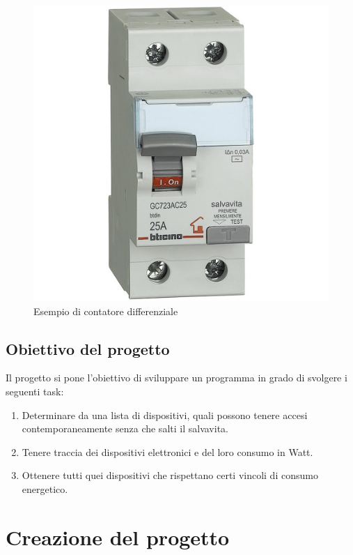 \documentclass[12pt, letterpaper]{article}
\begin{document}
\begin{figure}
      \centering
      \includegraphics[scale=0.2]{interruttore-diff.jpg}
      \caption{Esempio di contatore differenziale}
\end{figure}


\subsection{Obiettivo del progetto}

Il progetto si pone l'obiettivo di sviluppare un programma in grado di svolgere
i seguenti task:

\begin{enumerate}
      \item Determinare da una lista di dispositivi, quali possono tenere accesi contemporaneamente
            senza che salti il salvavita.
      \item Tenere traccia dei dispositivi elettronici e del loro consumo in Watt.
      \item Ottenere tutti quei dispositivi che rispettano certi vincoli di consumo energetico.
\end{enumerate}

\section{Creazione del progetto}
\end{document}
